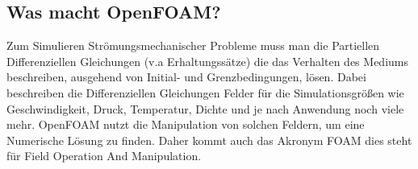 \subsection{Was macht OpenFOAM?}
Zum Simulieren Strömungsmechanischer Probleme muss man die Partiellen Differenziellen Gleichungen (v.a Erhaltungssätze) die das Verhalten des Mediums beschreiben, ausgehend von Initial- und Grenzbedingungen, lösen.
Dabei beschreiben die Differenziellen Gleichungen Felder für die Simulationsgrößen wie Geschwindigkeit, Druck, Temperatur, Dichte und je nach Anwendung noch viele mehr. OpenFOAM nutzt die Manipulation von solchen Feldern, um eine Numerische Lösung zu finden. Daher kommt auch das Akronym FOAM dies steht für Field Operation And Manipulation.

